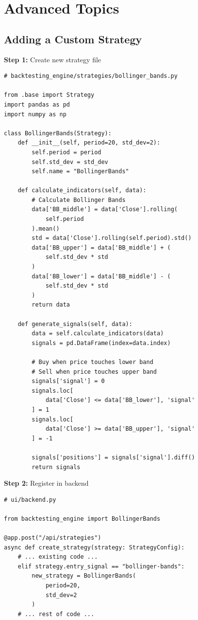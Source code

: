 \documentclass[11pt,a4paper]{article}
\begin{document}
\section{Advanced Topics}

\subsection{Adding a Custom Strategy}

\textbf{Step 1:} Create new strategy file

\begin{lstlisting}[style=pythoncode]
# backtesting_engine/strategies/bollinger_bands.py

from .base import Strategy
import pandas as pd
import numpy as np

class BollingerBands(Strategy):
    def __init__(self, period=20, std_dev=2):
        self.period = period
        self.std_dev = std_dev
        self.name = "BollingerBands"
        
    def calculate_indicators(self, data):
        # Calculate Bollinger Bands
        data['BB_middle'] = data['Close'].rolling(
            self.period
        ).mean()
        std = data['Close'].rolling(self.period).std()
        data['BB_upper'] = data['BB_middle'] + (
            self.std_dev * std
        )
        data['BB_lower'] = data['BB_middle'] - (
            self.std_dev * std
        )
        return data
        
    def generate_signals(self, data):
        data = self.calculate_indicators(data)
        signals = pd.DataFrame(index=data.index)
        
        # Buy when price touches lower band
        # Sell when price touches upper band
        signals['signal'] = 0
        signals.loc[
            data['Close'] <= data['BB_lower'], 'signal'
        ] = 1
        signals.loc[
            data['Close'] >= data['BB_upper'], 'signal'
        ] = -1
        
        signals['positions'] = signals['signal'].diff()
        return signals
\end{lstlisting}

\textbf{Step 2:} Register in backend

\begin{lstlisting}[style=pythoncode]
# ui/backend.py

from backtesting_engine import BollingerBands

@app.post("/api/strategies")
async def create_strategy(strategy: StrategyConfig):
    # ... existing code ...
    elif strategy.entry_signal == "bollinger-bands":
        new_strategy = BollingerBands(
            period=20, 
            std_dev=2
        )
    # ... rest of code ...
\end{lstlisting}
\end{document}
